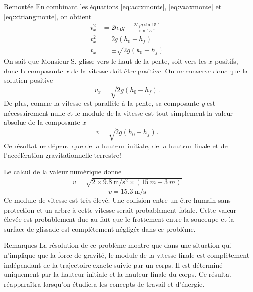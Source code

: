 \documentclass{tufte-handout}
\begin{document}
{\begin{subsection}{Remontée}
    En combinant les équations \ref{eq:accxmonte}, \ref{eq:vaaxmonte} et
    \ref{eq:xtriangmonte}, on obtient
    \begin{align*}
      v_x^2 &= 2h_0g - \frac{2h_fg\sin\SI{15}{\degree}}{\sin\SI{15}{\degree}} \\
      v_x^2 &= 2g(h_0 - h_f) \\
      v_x &= \pm\sqrt{2g(h_0 - h_f)}
    \end{align*}
    On sait que Monsieur S. glisse vers le haut de la pente, soit vers les $x$
    positifs, donc la composante $x$ de la vitesse doit être positive. On ne
    conserve donc que la solution positive
    \begin{equation*}
      v_x = \sqrt{2g(h_0 - h_f)}.
    \end{equation*}
    De plus, comme la vitesse est parallèle à la pente, sa composante $y$ est
    nécessairement nulle et le module de la vitesse est tout simplement la
    valeur absolue de la composante $x$
    \begin{equation}
    \label{eq:vfdescente}
      v = \sqrt{2g(h_0 - h_f)}.
    \end{equation}
    Ce résultat ne dépend que de la hauteur initiale, de la hauteur finale et
    de l'accélération gravitationnelle terrestre!

    Le calcul de la valeur numérique donne
    \begin{align*}
      v = \sqrt{2 \times \SI{9.8}{\meter\per\second\squared} \times
          (\SI{15}{m} - \SI{3}{m})}
    \end{align*}
    \begin{equation*}
      \boxed{v = \SI{15.3}{\meter\per\second}}
    \end{equation*}
    Ce module de vitesse est très élevé. Une collision entre un être humain
    sans protection et un arbre à cette vitesse serait probablement fatale.
    Cette valeur élevée est probablement due au fait que le frottement entre la
    soucoupe et la surface de glissade est complètement négligée dans ce
    problème.
  \end{subsection}

  \begin{subsection}{Remarques}
    La résolution de ce problème montre que dans une situation qui n'implique
    que la force de gravité, le module de la vitesse finale est complètement
    indépendant de la trajectoire exacte suivie par un corps. Il est déterminé
    uniquement par la hauteur initiale et la hauteur finale du corps. Ce
    résultat réapparaîtra lorsqu'on étudiera les concepts de travail et
    d'énergie.
  \end{subsection}
}
\end{document}
